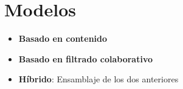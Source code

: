 \section{Modelos}
\begin{frame}
\begin{itemize}
    \item<1-> \textbf{Basado en contenido}
    \item<2-> \textbf{Basado en filtrado colaborativo}
    \item<4-> \textbf{Híbrido}: Ensamblaje de los dos anteriores
\end{itemize}
\end{frame}

